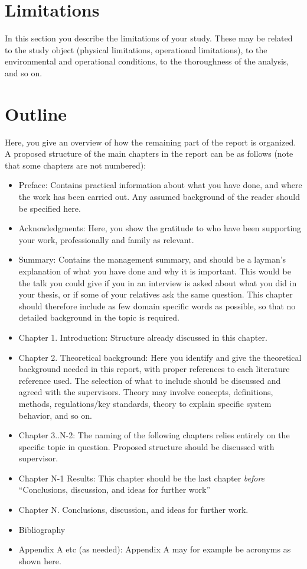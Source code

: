 \documentclass[../Main/thesis.tex]{subfiles}
\begin{document}
\section{Limitations}
\label{sec:limitations}
In this section you describe the limitations of your study. 
These may be related to the study object (physical limitations, operational limitations), to the environmental and operational conditions, to the thoroughness of the analysis, and so on.

\section{Outline}
\label{sec:outline}
Here, you give an overview of how the remaining part of the report is organized. 
A proposed structure of the main chapters in the report can be as follows (note that some chapters are not numbered):
\begin{itemize}
\item Preface: Contains practical information about what you have done, and where the work has been carried out. Any assumed background of the reader should be specified here.
\item Acknowledgments: Here, you show the gratitude to who have been supporting your work, professionally and family as relevant.
\item Summary: Contains the management summary, and should be a layman's explanation of what you have done and why it is important. This would be the talk you could give if you in an  interview is asked about what you did in your thesis, or if some of your relatives ask the same question. This chapter should therefore include as few domain specific words as possible, so that no detailed background in the topic is required. 
\item Chapter 1. Introduction: Structure already discussed in this chapter.
\item Chapter 2. Theoretical background: Here you identify and give the theoretical background needed in this report, with proper references to each literature reference used. The selection of what to include should be discussed and agreed with the supervisors. Theory may involve concepts, definitions, methods, regulations/key standards, theory to explain specific system behavior, and so on.
\item Chapter 3..N-2: The naming of the following chapters relies entirely on the specific topic in question. Proposed structure should be discussed with supervisor.
\item Chapter N-1 Results: This chapter should be the last chapter \textit{before} ``Conclusions, discussion, and ideas for further work''
\item Chapter N. Conclusions, discussion, and ideas for further work.
\item Bibliography
\item Appendix A etc (as needed): Appendix A may for example be acronyms as shown here.
\end{itemize}
\end{document}
